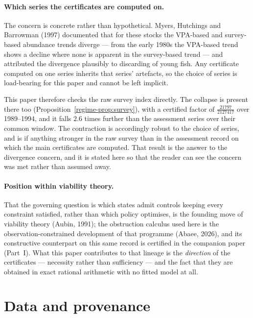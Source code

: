 \paragraph{Which series the certificates are computed on.} The concern is concrete rather
than hypothetical. Myers, Hutchings and Barrowman (1997) documented that for these stocks the
VPA-based and survey-based abundance trends diverge --- from the early 1980s the VPA-based
trend shows a decline where none is apparent in the survey-based trend --- and attributed the
divergence plausibly to discarding of young fish. Any certificate computed on one series
inherits that series' artefacts, so the choice of series is load-bearing for this paper and
cannot be left implicit.

This paper therefore checks the raw survey index directly. The collapse is present there too
(Proposition~\ref{regime-prop:survey}), with a certified factor of $\tfrac{21797}{2127417}$ over
1989--1994, and it falls $2.6$ times further than the assessment series over their common
window. The contraction is accordingly robust to the choice of series, and is if anything
stronger in the raw survey than in the assessment record on which the main certificates are
computed. That result is the answer to the divergence concern, and it is stated here so that
the reader can see the concern was met rather than assumed away.

\paragraph{Position within viability theory.} That the governing question is which states
admit controls keeping every constraint satisfied, rather than which policy optimises, is the
founding move of viability theory (Aubin, 1991); the obstruction calculus used here is the
observation-constrained development of that programme (Abaee, 2026), and its constructive
counterpart on this same record is certified in the companion paper (Part~I). What this paper
contributes to that lineage is the \emph{direction} of the certificates --- necessity rather
than sufficiency --- and the fact that they are obtained in exact rational arithmetic with no
fitted model at all.

\section{Data and provenance}\label{regime-data}

